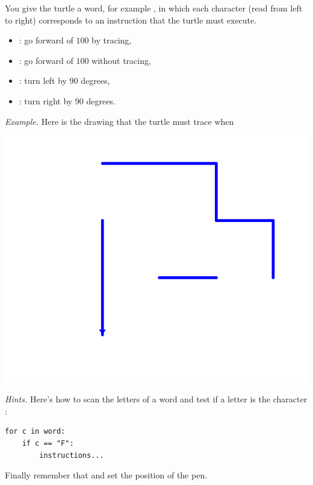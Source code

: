 \documentclass[11pt,class=report,crop=false]{standalone}
\begin{document}
\begin{activite}


You give the turtle a word, for example 
, in which each character (read from left to right) corresponds to an instruction that the turtle must execute.

\begin{itemize}
  \item {} : go forward of $100$ by tracing,
  \item {} : go forward of $100$ without tracing,  
  \item {} : turn left by $90$ degrees,
  \item {} : turn right by $90$ degrees.
\end{itemize}

\emph{Example.}
Here is the drawing that the turtle must trace when

\begin{center}
\includegraphics[scale=\myscale,scale=0.4]{screen-ifthen-2}
\end{center}

\emph{Hints.}
Here's how to scan the letters of a word and test if a letter is the character :
\begin{center}
\begin{minipage}{0.5\textwidth}
\begin{lstlisting}
for c in word:
    if c == "F":
        instructions...
\end{lstlisting}
\end{minipage} 
\end{center} 
Finally remember that  and  set the position of the pen.

\end{activite}
\end{document}
